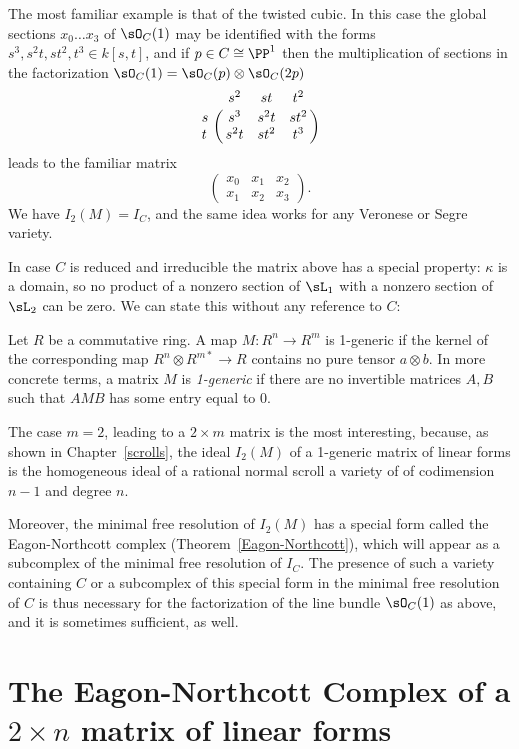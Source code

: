 \begin{example}
The most familiar example is that of the twisted cubic. In this case the global sections $x_0\dots x_3$ of $\sO_C(1)$ may be identified with the forms $s^3, s^2t, st^2, t^3 \in k[s,t]$, and if $p\in C \cong \PP^1$ then the multiplication of sections
in the factorization  $\sO_C(1) = \sO_C(p) \otimes \sO_C(2p)$ 
$$
\bordermatrix{
 &s^2&st&t^2\cr
 s& s^3&s^2t&st^2\cr
 t& s^2t&st^2&t^3
}
$$
 leads to the familiar matrix
$$
\begin{pmatrix}
x_0&x_1&x_2\\
x_1&x_2&x_3 
\end{pmatrix}.
$$
We have $I_2(M) = I_C$, and the same idea works for any Veronese or Segre variety.
\end{example}

In case $C$ is reduced and irreducible the matrix above has a special property: $\kappa $ is a domain, so no product of a nonzero
section of $\sL_1$ with a nonzero section of $\sL_2$ can be zero. We can state this without any reference to $C$:

\begin{definition}
Let $R$ be a commutative ring. A map $M:R^n\to R^m$ is 1-generic if the kernel of the corresponding
 map $R^{n}\otimes R^{m*} \to R$  contains no pure tensor $a\otimes b$. In more concrete terms, a matrix
$M$ is \emph{1-generic} if there are no invertible matrices $A,B$ such that  $AMB$ has some entry equal to 0.
\end{definition}

The case $m=2$, leading to a $2\times m$ matrix is the most interesting, because, as shown in Chapter~\ref{scrolls}, the ideal $I_2(M)$ of a 1-generic matrix of linear forms is the homogeneous ideal of a rational normal 
scroll a variety of of codimension $n-1$ and degree $n$. 

Moreover, the minimal free resolution of $I_2(M)$ has a special form called the 
Eagon-Northcott complex (Theorem~\ref{Eagon-Northcott}), which will appear as a subcomplex of the minimal free resolution of $I_C$. The presence of such a variety containing $C$ or
a subcomplex of this special form in the minimal free resolution of $C$ is thus necessary for the 
factorization of the line bundle $\sO_C(1)$ as above, and it is sometimes sufficient, as well.

\section{The Eagon-Northcott Complex of a $2\times n$ matrix of linear forms}

